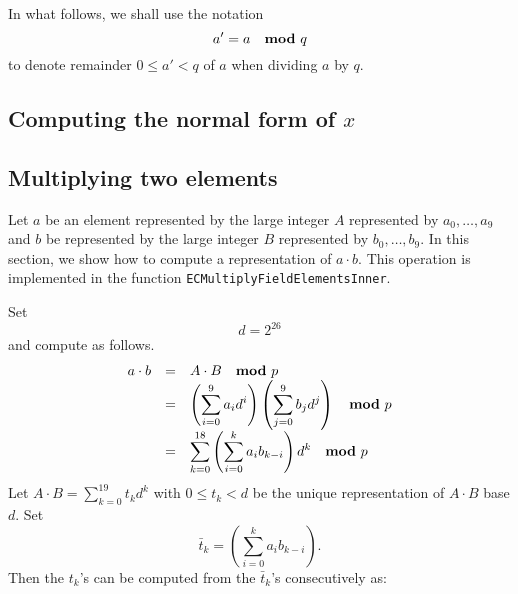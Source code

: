 \documentclass{article}
\renewcommand{\mod}{{~~~\bf mod~}}
\begin{document}
In what follows, we shall use the notation
\[
a'=a \mod q
\]
to denote remainder $0\leq a' <q$  of $a$ when dividing $a$ by $q$.
\subsection{Computing the normal form of $x$}

\subsection{Multiplying two elements}
Let $a$ be an element represented by the large integer $A$ represented by $a_0, \dots, a_9$ and $b$ be represented by the large integer $B$ represented by $b_0, \dots, b_9$. In this section, we show how to compute a representation of $a\cdot b$. This operation is implemented in the function \verb|ECMultiplyFieldElementsInner|. 

Set 
\[
d= 2^{26}
\]
and compute as follows.
\[
\begin{array}{rcl}
\displaystyle a\cdot b&=&\displaystyle A\cdot B \mod p\\
&=&\displaystyle \left(\sum_{i=0}^9 a_i d^i \right) \left(\sum_{j=0}^9 b_j d^j\right)   \mod p\\
&=&\displaystyle  \sum_{k=0}^{18} \left(\sum_{i=0}^k a_i b_{k-i} \right) d^k  \mod p
\end{array}
\]
Let $A\cdot B = \sum_{k=0}^{19} t_k d^k$ with $0\leq t_k < d$ be the unique representation of $A\cdot B$ base $d$. Set
\[
\bar t_k = \left(\sum_{i=0}^k a_i b_{k-i} \right).
\]
Then the $t_k$'s can be computed from the $\bar t_k$'s consecutively as:
 





\end{document}
